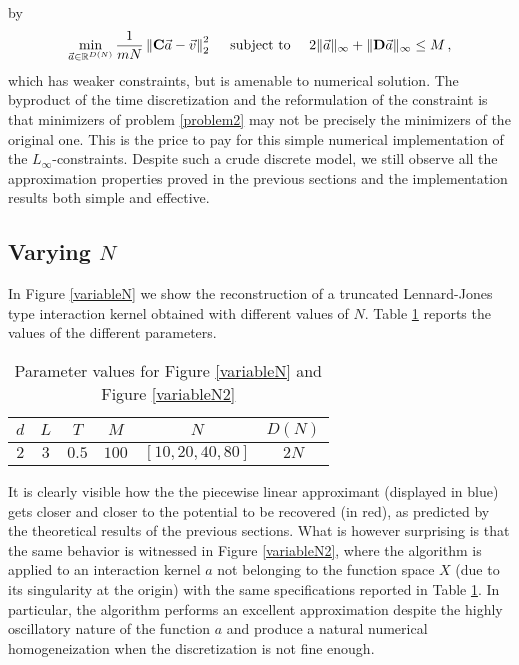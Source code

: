 by
\begin{align}\label{problem2}
\min_{\vec{a} \in \mathbb{R}^{D(N)}} \frac{1}{mN} \left\|\mathbf C \vec{a} - \vec v \right\|^2_{2} \quad \text{ subject to } \quad 2\|\vec{a}\|_{\infty} + \|\mathbf D\vec{a}\|_{\infty} \leq M\,,
\end{align}
which has weaker constraints, but is amenable to numerical solution.
The byproduct of the time discretization and the reformulation of the constraint is that minimizers of problem \eqref{problem2} may not be precisely the minimizers of the original one. This is the price to pay for this simple numerical implementation of the $L_\infty$-constraints. Despite such a crude discrete model,  we still observe all the approximation properties proved in the previous sections and the implementation results both simple and effective.

\subsection{Varying $N$}

In Figure \ref{variableN} we show the reconstruction of a truncated Lennard-Jones type interaction kernel obtained with different values of $N$. Table \ref{tab:fig1} reports the values of the different parameters.

\begin{table}[h!]%
\begin{center}
\begin{tabular}{ |c|c|c|c|c|c| }
\hline
  $d$ & $L$ & $T$ & $M$ & $N$ & $D(N)$ \\
\hline
\hline
  $2$ & $3$ & $0.5$ & $100$ & $[10,20,40,80]$ & $2N$ \\
\hline
\end{tabular}
\end{center}
\vspace{-0.5cm}
\caption{Parameter values for Figure \ref{variableN} and Figure \ref{variableN2} } \label{tab:fig1} 
\end{table}

It is clearly visible how the the piecewise linear approximant (displayed in blue) gets closer and closer to the potential to be recovered (in red), as predicted by the theoretical results of the previous sections. What is however surprising is that the same behavior is witnessed in Figure \ref{variableN2}, where the algorithm is applied to an interaction kernel $a$ not belonging to the function space $X$ (due to its singularity at the origin) with the same specifications reported in Table \ref{tab:fig1}. In particular, the algorithm performs an excellent approximation despite the highly oscillatory nature of the function $a$ and produce a natural numerical homogeneization when the discretization is not fine enough.

